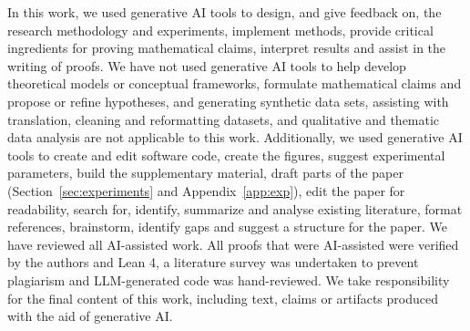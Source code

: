 In this work, we used generative AI tools to design, and give feedback on, the research methodology and experiments, implement methods, provide critical ingredients for proving mathematical claims, interpret results and assist in the writing of proofs.
We have not used generative AI tools to help develop theoretical models or conceptual frameworks, formulate mathematical claims and propose or refine hypotheses,
and generating synthetic data sets, assisting with translation, cleaning and reformatting datasets, and qualitative and thematic data analysis are not applicable to this work.
Additionally, we used generative AI tools to create and edit software code, create the figures, suggest experimental parameters, build the supplementary material, draft parts of the paper (Section~\ref{sec:experiments} and Appendix~\ref{app:exp}), edit the paper for readability, search for, identify, summarize and analyse existing literature, format references, brainstorm, identify gaps and suggest a structure for the paper. 
We have reviewed all AI-assisted work. All proofs that were AI-assisted were verified by the authors and Lean 4, a literature survey was undertaken to prevent plagiarism and LLM-generated code was hand-reviewed.
We take responsibility for the final content of this work, including text, claims or artifacts produced with the aid of generative AI.
